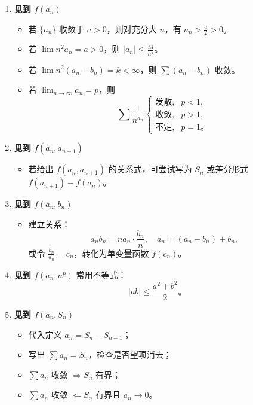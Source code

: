 \begin{enumerate}
    \item \textbf{见到 $f(a_n)$}
          \begin{itemize}
              \item 若 $\{a_n\}$ 收敛于 $a>0$，则对充分大 $n$，有 $a_n>\tfrac{a}{2}>0$。
              \item 若 $\lim n^2 a_n = a>0$，则 $|a_n|\le \tfrac{M}{n^2}$。
              \item 若 $\lim n^2(a_n-b_n)=k<\infty$，则 $\sum (a_n-b_n)$ 收敛。
              \item 若 $\lim_{n\to\infty}a_n=p$，则
                    \[
                        \sum\frac{1}{n^{a_n}}
                        \begin{cases}
                            \text{发散,} & p<1, \\
                            \text{收敛,} & p>1, \\
                            \text{不定,} & p=1。
                        \end{cases}
                    \]
          \end{itemize}

    \item \textbf{见到 $f(a_n,a_{n+1})$}
          \begin{itemize}
              \item 若给出 $f(a_n,a_{n+1})$ 的关系式，可尝试写为 $S_n$ 或差分形式 $f(a_{n+1})-f(a_n)$。
          \end{itemize}

    \item \textbf{见到 $f(a_n,b_n)$}
          \begin{itemize}
              \item 建立关系：
                    \[
                        a_n b_n = n a_n \cdot \frac{b_n}{n}, \quad
                        a_n = (a_n-b_n)+b_n,
                    \]
                    或令 $\frac{b_n}{a_n}=c_n$，转化为单变量函数 $f(c_n)$。
          \end{itemize}

    \item \textbf{见到 $f(a_n, n^p)$}
          常用不等式：
          \[
              |ab|\le \frac{a^2+b^2}{2}。
          \]

    \item \textbf{见到 $f(a_n,S_n)$}
          \begin{itemize}
              \item 代入定义 $a_n=S_n-S_{n-1}$；
              \item 写出 $\sum a_n = S_n$，检查是否望项消去；
              \item $\sum a_n$ 收敛 $\Rightarrow S_n$ 有界；
              \item $\sum a_n$ 收敛 $\Leftarrow S_n$ 有界且 $a_n\to 0$。
          \end{itemize}


\end{enumerate}
